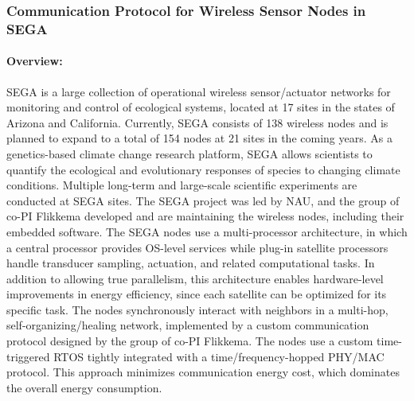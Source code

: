 \subsubsection{Communication Protocol for Wireless Sensor Nodes in SEGA}
\label{sec:sega-case-study}

\paragraph{Overview:}

SEGA is a large collection of operational wireless sensor/actuator networks for monitoring and control of ecological systems, located at 17 sites in the states of Arizona and California.
Currently, SEGA consists of 138 wireless nodes and is planned to expand to a total of 154 nodes at 21 sites in the coming years.
As a genetics-based climate change research platform, SEGA allows scientists to quantify the ecological and evolutionary responses of species to changing climate conditions.
Multiple long-term and large-scale scientific experiments are conducted at SEGA sites.
The SEGA project was led by NAU, and the group of co-PI Flikkema developed and are maintaining the wireless nodes, including their embedded software.
%
The SEGA nodes use a multi-processor architecture, in which a central processor provides OS-level services %
while plug-in satellite processors handle transducer sampling, actuation, and related computational tasks.
In addition to allowing true parallelism, this architecture enables hardware-level improvements in energy efficiency, since each satellite can be optimized for its specific task.
%
The nodes synchronously interact with neighbors in a multi-hop, self-organizing/healing network, implemented by a custom communication protocol designed by the group of co-PI Flikkema. %
The nodes use a custom time-triggered RTOS tightly integrated with a time/frequency-hopped PHY/MAC protocol.
This approach %
minimizes communication energy cost, which dominates the overall energy consumption.

